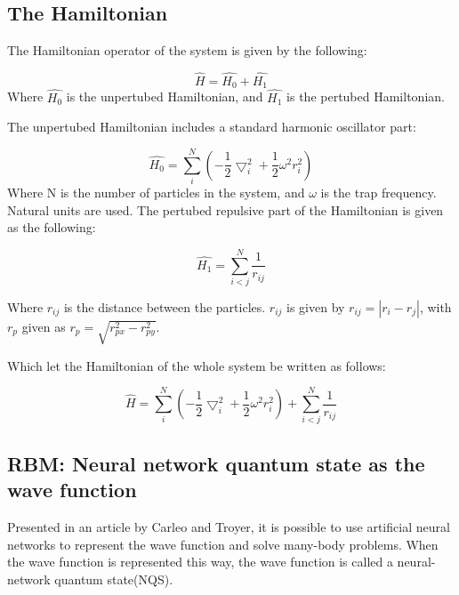 \documentclass[../main.tex]{subfiles}
\begin{document}
\subsection{The Hamiltonian}
\label{sec:hydrogenhamil}
The Hamiltonian operator of the system is given by the following:

\begin{equation}
    \hat{H}=\hat{H_0}+\hat{H_1}
\end{equation}
Where \ensuremath{\hat{H_0}} is the unpertubed Hamiltonian, and \ensuremath{\hat{H_1}} is the pertubed Hamiltonian.

The unpertubed Hamiltonian includes a standard harmonic oscillator part:

\begin{equation}
     \hat{H_0} = \sum_i^N \left(-\frac{1}{2}{\bigtriangledown }_{i}^2 + \frac{1}{2}\omega^2 r_i^2\right)
	\label{eq:Hamilton}
 \end{equation}
 Where N is the number of particles in the system, and \ensuremath{\omega} is the trap frequency. Natural units are used. The pertubed repulsive part of the Hamiltonian is given as the following:
 
\begin{equation}
    \hat{H_1}=\sum_{i<j}^{N} \frac{1}{r_{ij}}
\end{equation}

Where \ensuremath{r_{ij}} is the distance between the particles. \ensuremath{r_{ij}} is given by \ensuremath{r_{ij}=|r_i-r_j|}, with \ensuremath{r_p} given as \ensuremath{r_p=\sqrt{r_{px}^2-r_{py}^2}}.

Which let the Hamiltonian of the whole system be written as follows:

\begin{equation}
    \hat{H}=\sum_i^N \left(-\frac{1}{2}{\bigtriangledown }_{i}^2 + \frac{1}{2}\omega^2 r_i^2\right)+\sum_{i<j}^{N} \frac{1}{r_{ij}}
    \label{eq:hamilhamil}
\end{equation}

\subsection{RBM: Neural network quantum state as the wave function}
Presented in an article by Carleo and Troyer\cite{solving_manybody_with_ann}, it is possible to use artificial neural networks to represent the wave function and solve many-body problems. When the wave function is represented this way, the wave function is called a neural-network quantum state(NQS).
\end{document}
